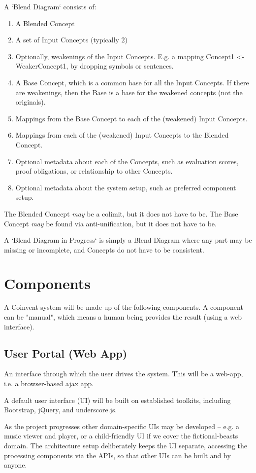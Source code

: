 \documentclass[a4paper,twoside,11pt]{article}
\begin{document}
A `Blend Diagram` consists of:
\begin{enumerate}
\item A Blended Concept
\item A set of Input Concepts (typically 2)
\item Optionally, weakenings of the Input Concepts. E.g. a mapping Concept1 <- WeakerConcept1, by dropping symbols or sentences.
\item A Base Concept, which is a common base for all the Input Concepts. If there are weakenings, then the Base is a base for the weakened concepts (not the originals).
\item Mappings from the Base Concept to each of the (weakened) Input Concepts.
\item Mappings from each of the (weakened) Input Concepts to the Blended Concept.
\item Optional metadata about each of the Concepts, such as evaluation scores,  proof obligations, or relationship to other Concepts.
\item Optional metadata about the system setup, such as preferred component setup.
\end{enumerate}
The Blended Concept {\em may} be a colimit, but it does not have to be.
The Base Concept {\em may} be found via anti-unification, but it does not have to be.

A `Blend Diagram in Progress` is simply a Blend Diagram where any part may be missing or incomplete, and Concepts do not have to be consistent. 


\section{Components}\label{sec:components}

A Coinvent system will be made up of the following components.
A component can be "manual", which means a human being provides the result (using a web interface).

\subsection{User Portal (Web App)}\label{sec:userportal}
An interface through which the user drives the system. This will be a web-app,
i.e. a browser-based ajax app.

A default user interface (UI) will be built on established toolkits, including Bootstrap, jQuery, and underscore.js.

As the project progresses other domain-specific UIs may be developed -- e.g. a music viewer and player, 
or a child-friendly UI if we cover the fictional-beasts domain. 
The architecture setup deliberately keeps the UI separate, accessing the processing components via the APIs, so that other UIs can be built and by anyone.
\end{document}
